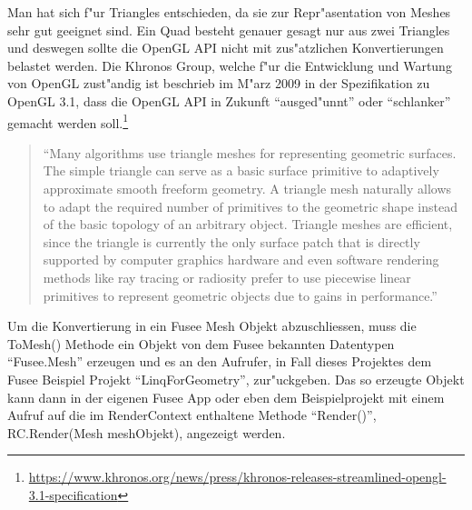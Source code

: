 \documentclass[pagesize, paper=a4, fontsize=12pt,titlepage=true, headings=small, headnosepline, abstractoff, liststotoc, nochapterprefix, plainheadsepline]{scrreprt}
\newcommand{\LFG}{LINQ For Geometry}
\begin{document}
Man hat sich f"ur Triangles entschieden, da sie zur Repr"asentation von Meshes sehr gut geeignet sind. Ein Quad besteht genauer gesagt nur aus zwei Triangles und deswegen sollte die OpenGL API nicht mit zus"atzlichen Konvertierungen belastet werden. Die Khronos Group, welche f"ur die Entwicklung und Wartung von OpenGL zust"andig ist beschrieb im M"arz 2009 in der Spezifikation zu OpenGL 3.1, dass die OpenGL API in Zukunft "`ausged"unnt"' oder "`schlanker"' gemacht werden soll.\footnote{\url{https://www.khronos.org/news/press/khronos-releases-streamlined-opengl-3.1-specification}}
\newpage
\begin{quote}"`Many algorithms use triangle meshes for representing geometric surfaces. The simple triangle can serve as a basic surface primitive to adaptively approximate smooth freeform geometry. A triangle mesh naturally allows to adapt the required number of primitives to the geometric shape instead of the basic topology of an arbitrary object. Triangle meshes are efficient, since the triangle is currently the only surface patch that is directly supported by computer graphics hardware and even software rendering methods like ray tracing or radiosity prefer to use piecewise linear primitives to represent geometric objects due to gains in performance."' \cite[S.~1]{Campagna.1998}\end{quote}

Um die Konvertierung in ein Fusee Mesh Objekt abzuschliessen, muss die ToMesh() Methode ein Objekt von dem Fusee bekannten Datentypen "`Fusee.Mesh"' erzeugen und es an den Aufrufer, in Fall dieses Projektes dem Fusee Beispiel Projekt "`LinqForGeometry"', zur"uckgeben. Das so erzeugte Objekt kann dann in der eigenen Fusee App oder eben dem Beispielprojekt mit einem Aufruf auf die im RenderContext enthaltene Methode "`Render()"', RC.Render(Mesh meshObjekt), angezeigt werden.

\end{document}
